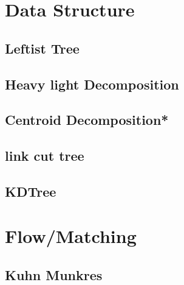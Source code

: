 \section{Data Structure}
\subsection{Leftist Tree}

\subsection{Heavy light Decomposition}

\subsection{Centroid Decomposition*} %

% 
% 
\subsection{link cut tree}

\subsection{KDTree}



\section{Flow/Matching}
% 
\subsection{Kuhn Munkres}


